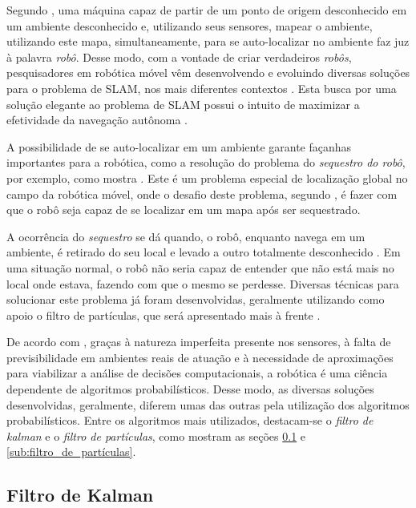 Segundo \cite{slamProblem}, uma máquina capaz de partir de um ponto de origem desconhecido em um ambiente desconhecido e, utilizando seus sensores, mapear o ambiente, utilizando este mapa, simultaneamente, para se auto-localizar no ambiente faz juz à palavra \textit{robô}. Desse modo, com a vontade de criar verdadeiros \textit{robôs}, pesquisadores em robótica móvel vêm desenvolvendo e evoluindo diversas soluções para o problema de SLAM, nos mais diferentes contextos \cite{integrationVisionSLAMnonlinear}. Esta busca por uma solução elegante ao problema de SLAM possui o intuito de maximizar a efetividade da navegação autônoma \cite{theCleaningProject}. 

A possibilidade de se auto-localizar em um ambiente garante façanhas importantes para a robótica, como a resolução do problema do \textit{sequestro do robô}, por exemplo, como mostra \cite{sequestro}. Este é um problema especial de localização global no campo da robótica móvel, onde o desafio deste problema, segundo \cite{sequestroRobo}, é fazer com que o robô seja capaz de se localizar em um mapa após ser sequestrado.

A ocorrência do \textit{sequestro} se dá quando, o robô, enquanto navega em um ambiente, é retirado do seu local e levado a outro totalmente desconhecido \cite{sequestro}. Em uma situação normal, o robô não seria capaz de entender que não está mais no local onde estava, fazendo com que o mesmo se perdesse. Diversas técnicas para solucionar este problema já foram desenvolvidas, geralmente utilizando como apoio o filtro de partículas, que será apresentado mais à frente \cite{sequestroRobo}. 

De acordo com \cite{circumventingAssociationSLAM}, graças à natureza imperfeita presente nos sensores, à falta de previsibilidade em ambientes reais de atuação e à necessidade de aproximações para viabilizar a análise de decisões computacionais, a robótica é uma ciência dependente de algoritmos probabilísticos. Desse modo, as diversas soluções desenvolvidas, geralmente, diferem umas das outras pela utilização dos algoritmos probabilísticos. Entre os algoritmos mais utilizados, destacam-se o \textit{filtro de kalman} e o \textit{filtro de partículas}, como mostram as seções \ref{sub:kalman} e \ref{sub:filtro_de_partículas}.

\subsection{Filtro de Kalman} %
\label{sub:kalman}

